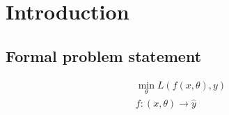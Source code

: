 \documentclass[../main.tex]{subfiles}
\begin{document}
\section{Introduction}
\label{sec:introduction}
\subsection{Formal problem statement}
\label{subsec:formal_statement}

\begin{align}
    \min_{\theta} L(f(x,\theta),y)\\
    f:(x,\theta) \rightarrow \hat{y}
\end{align}
\end{document}
